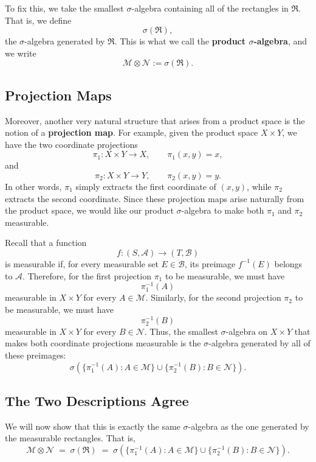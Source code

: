 \documentclass[11pt]{article}
\theoremstyle{definition}
\theoremstyle{plain}
\newcommand{\M}{\mathcal{M}}
\newcommand{\N}{\mathcal{N}}
\newcommand{\A}{\mathcal{A}}
\newcommand{\B}{\mathcal{B}}
\newcommand{\Rect}{\mathfrak{R}}
\begin{document}
To fix this, we take the smallest $\sigma$-algebra containing all of
the rectangles in $\Rect$. That is, we define
\[
  \sigma(\Rect),
\]
the $\sigma$-algebra generated by $\Rect$. This is what we call the
\textbf{product $\sigma$-algebra}, and we write
\[
  \M \otimes \N := \sigma(\Rect).
\]

\subsection{Projection Maps}

Moreover, another very natural structure that arises from a product
space is the notion of a \textbf{projection map}. For example, given
the product space $X \times Y$, we have the two coordinate projections
\[
  \pi_1 : X \times Y \to X, \qquad \pi_1(x,y) = x,
\]
and
\[
  \pi_2 : X \times Y \to Y, \qquad \pi_2(x,y) = y.
\]
In other words, $\pi_1$ simply extracts the first coordinate of
$(x,y)$, while $\pi_2$ extracts the second coordinate. Since these
projection maps arise naturally from the product space, we would like
our product $\sigma$-algebra to make both $\pi_1$ and $\pi_2$
measurable.

Recall that a function
\[
  f : (S,\A) \to (T,\B)
\]
is measurable if, for every measurable set $E \in \B$, its preimage
$f^{-1}(E)$ belongs to $\A$. Therefore, for the first projection
$\pi_1$ to be measurable, we must have
\[
  \pi_1^{-1}(A)
\]
measurable in $X \times Y$ for every $A \in \M$. Similarly, for the
second projection $\pi_2$ to be measurable, we must have
\[
  \pi_2^{-1}(B)
\]
measurable in $X \times Y$ for every $B \in \N$. Thus, the smallest
$\sigma$-algebra on $X \times Y$ that makes both coordinate projections
measurable is the $\sigma$-algebra generated by all of these preimages:
\[
  \sigma\left( \{\pi_1^{-1}(A) : A \in \M\}
    \cup \{\pi_2^{-1}(B) : B \in \N\} \right).
\]

\subsection{The Two Descriptions Agree}

We will now show that this is exactly the same $\sigma$-algebra as the
one generated by the measurable rectangles. That is,
\[
  \M \otimes \N \;=\; \sigma(\Rect)
    \;=\; \sigma\left( \{\pi_1^{-1}(A) : A \in \M\}
      \cup \{\pi_2^{-1}(B) : B \in \N\} \right).
\]
\end{document}
